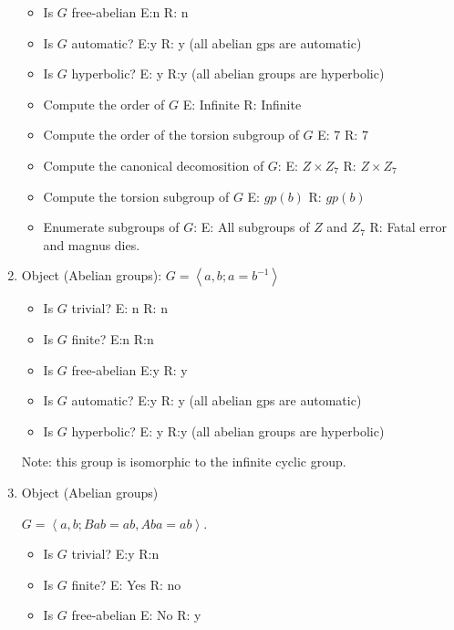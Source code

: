 \documentclass{article}
\begin{document}
\begin{enumerate}
\begin{itemize}
\item Is $G$ free-abelian E:n  R: n

\item Is $G$ automatic? E:y  R: y (all abelian gps are automatic)

\item Is $G$ hyperbolic? E: y R:y (all abelian groups are hyperbolic)

\item Compute the order of $G$
E: Infinite R: Infinite
\item Compute the order of the torsion subgroup of $G$
E: 7 R: 7
\item Compute the canonical decomosition of $G$:
E: $Z \times Z_7$ R: $Z \times Z_7$


\item Compute the torsion subgroup of $G$
E: $gp(b)$ R: $gp(b)$ 
\item Enumerate subgroups of $G$:
E: All subgroups of $Z$ and $Z_7$ 
R: Fatal error and magnus dies.
\end{itemize}
\item Object (Abelian groups): $G=\left<a,b; a=b^{-1} \right>$
\begin{itemize}

\item Is $G$ trivial? E: n R: n

\item Is $G$ finite? E:n R:n 

\item Is $G$ free-abelian E:y  R: y

\item Is $G$ automatic? E:y  R: y (all abelian gps are automatic)

\item Is $G$ hyperbolic? E: y R:y (all abelian groups are hyperbolic)
\end{itemize}
Note: this group is isomorphic to the infinite cyclic group.

\item Object (Abelian groups)

$G=\left<a,b; Bab=ab, Aba=ab \right>$.
\begin{itemize}


\item Is $G$ trivial? E:y  R:n 

\item Is $G$ finite? E: Yes R: no 

\item Is $G$ free-abelian E: No R: y


\end{itemize}
\end{enumerate}
\end{document}
